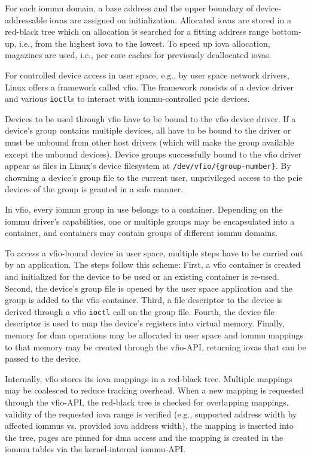For each \ac{iommu} domain, a base address and the upper boundary of
device-addressable \acp{iova} are assigned on initialization. Allocated
\acp{iova} are stored in a red-black tree which on allocation is searched for a
fitting address range bottom-up, i.e., from the highest \ac{iova} to the lowest.
To speed up \ac{iova} allocation, magazines are used, i.e., per core caches for
previously deallocated \acp{iova}.

For controlled device access in user space, e.g., by user space network drivers,
Linux offers a framework called \ac{vfio}. The framework consists of a device
driver and various \texttt{ioctl}s to interact with \ac{iommu}-controlled
\ac{pcie} devices.

Devices to be used through \ac{vfio} have to be bound to the \ac{vfio} device
driver. If a device's group contains multiple devices, all have to be bound to
the driver or must be unbound from other host drivers (which will make the group
available except the unbound devices). Device groups successfully bound to the
\ac{vfio} driver appear as files in Linux's device filesystem at
\texttt{/dev/vfio/\{group-number\}}. By chowning a device's group file to the
current user, unprivileged access to the \ac{pcie} devices of the group is
granted in a safe manner.

In \ac{vfio}, every \ac{iommu} group in use belongs to a container. Depending on
the \ac{iommu} driver's capabilities, one or multiple groups may be encapsulated
into a container, and containers may contain groups of different \ac{iommu}
domains.

To access a \ac{vfio}-bound device in user space, multiple steps have to be
carried out by an application. The steps follow this scheme: First, a \ac{vfio}
container is created and initialized for the device to be used or an existing
container is re-used. Second, the device's group file is opened by the
user space application and the group is added to the \ac{vfio} container. Third,
a file descriptor to the device is derived through a \ac{vfio} \texttt{ioctl}
call on the group file. Fourth, the device file descriptor is used to map the
device's registers into virtual memory. Finally, memory for \ac{dma} operations
may be allocated in user space and \ac{iommu} mappings to that memory may be
created through the \ac{vfio}-API, returning \acp{iova} that can be passed to
the device.

Internally, \ac{vfio} stores its \ac{iova} mappings in a red-black tree.
Multiple mappings may be coalesced to reduce tracking overhead. When a new
mapping is requested through the \ac{vfio}-API, the red-black tree is checked
for overlapping mappings, validity of the requested \ac{iova} range is verified
(e.g., supported address width by affected \acp{iommu} vs. provided \ac{iova}
address width), the mapping is inserted into the tree, pages are pinned for
\ac{dma} access and the mapping is created in the \ac{iommu} tables via the
kernel-internal \ac{iommu}-API.


